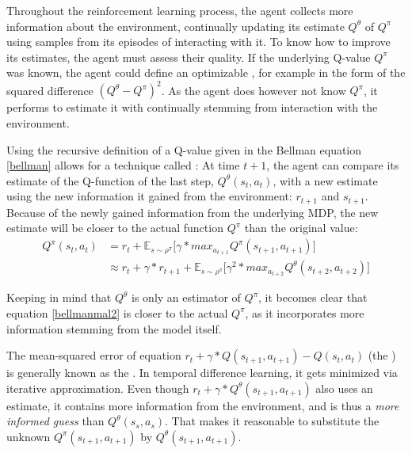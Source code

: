 Throughout the reinforcement learning process, the agent collects more information about the environment, continually updating its estimate $Q^\theta$ of $Q^\pi$ using samples from its episodes of interacting with it. To know how to improve its estimates, the agent must assess their quality. If the underlying Q-value $Q^\pi$ was known, the agent could define an optimizable , for example in the form of the squared difference $(Q^\theta - Q^\pi)^2$. As the agent does however not know $Q^\pi$, it performs  to estimate it with continually  stemming from interaction with the environment.


\noindent Using the recursive definition of a Q-value given in the Bellman equation \ref{bellman} allows for a technique called \cite{sutton_learning_1988}: At time $t+1$, the agent can compare its estimate of the Q-function of the last step, $Q^\theta(s_t, a_t)$, with a new estimate using the new information it gained from the environment: $r_{t+1}$ and $s_{t+1}$.  Because of the newly gained information from the underlying MDP, the new estimate will be closer to the actual function $Q^\pi$ than the original value:
\begin{align} 
	Q^\pi(s_t,a_t) &= r_t + \mathds{E}_{s\sim\rho^\pi} \big[ \gamma * max_{a_{t+1}} Q^\pi(s_{t+1},a_{t+1})  \big]\\
	                     &\approx r_t + \gamma * r_{t+1} + \mathds{E}_{s\sim\rho^\pi} \big[ \gamma^2 * max_{a_{t+2}} Q^\theta(s_{t+2},a_{t+2})  \big] \label{bellmanmal2}
\end{align}


Keeping in mind that $Q^\theta$ is only an estimator of $Q^\pi$, it becomes clear that equation \ref{bellmanmal2} is closer to the actual $Q^\pi$, as it incorporates more information stemming from the model itself. 

The mean-squared error of equation $r_t + \gamma * Q(s_{t+1},a_{t+1}) - Q(s_t,a_t)$ (the ) is generally known as the . In temporal difference learning, it gets minimized via iterative approximation. Even though $r_t + \gamma * Q^\theta(s_{t+1},a_{t+1})$ also uses an estimate, it contains more information from the environment, and is thus a \textit{more informed guess} than $Q^\theta(s_s,a_s)$. That makes it reasonable to substitute the unknown $Q^\pi(s_{t+1},a_{t+1})$ by $Q^\theta(s_{t+1},a_{t+1})$.

